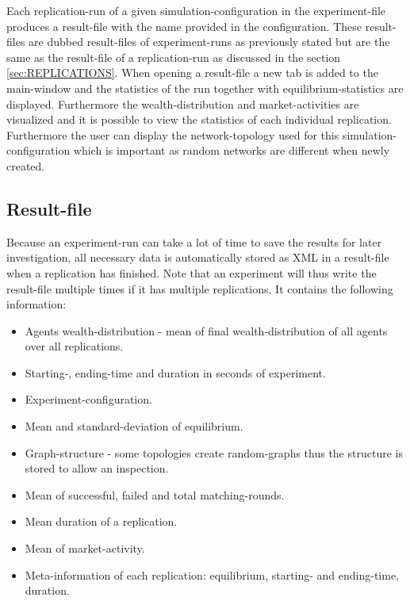 \documentclass[Bachelorarbeit.tex]{subfiles}
\begin{document}
\medskip

Each replication-run of a given simulation-configuration in the experiment-file produces a result-file with the name provided in the configuration. These result-files are dubbed result-files of experiment-runs as previously stated but are the same as the result-file of a replication-run as discussed in the section \ref{sec:REPLICATIONS}.
When opening a result-file a new tab is added to the main-window and the statistics of the run together with equilibrium-statistics are displayed. Furthermore the wealth-distribution and market-activities are visualized and it is possible to view the statistics of each individual replication. Furthermore the user can display the network-topology used for this simulation-configuration which is important as random networks are different when newly created.

\subsection{Result-file}
Because an experiment-run can take a lot of time to save the results for later investigation, all necessary data is automatically stored as XML in a result-file when a replication has finished. Note that an experiment will thus write the result-file multiple times if it has multiple replications. It contains the following information:

\begin{itemize}
\item Agents wealth-distribution - mean of final wealth-distribution of all agents over all replications.
\item Starting-, ending-time and duration in seconds of experiment.
\item Experiment-configuration.
\item Mean and standard-deviation of equilibrium.
\item Graph-structure - some topologies create random-graphs thus the structure is stored to allow an inspection.
\item Mean of successful, failed and total matching-rounds.
\item Mean duration of a replication.
\item Mean of market-activity.
\item Meta-information of each replication: equilibrium, starting- and ending-time, duration.
\end{itemize}
\end{document}
